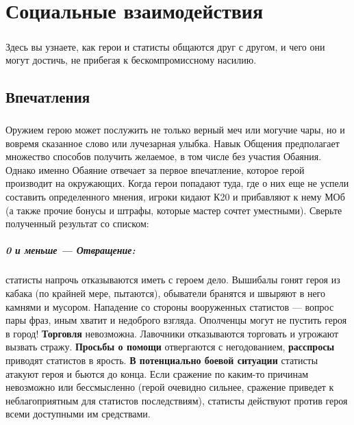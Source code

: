 \chapter{Социальные взаимодействия}
\paragraph{}
Здесь вы узнаете, как герои и статисты общаются друг с другом, и чего они могут достичь, не прибегая к бескомпромиссному насилию.
\section{Впечатления}
\paragraph{}
Оружием герою может послужить не только верный меч или могучие чары, но и вовремя сказанное слово или лучезарная улыбка. Навык Общения предполагает множество способов получить желаемое, в том числе без участия Обаяния. Однако именно Обаяние отвечает за первое впечатление, которое герой производит на окружающих. Когда герои попадают туда, где о них еще не успели составить определенного мнения, игроки кидают К20 и прибавляют к нему МОб (а также прочие бонусы и штрафы, которые мастер сочтет уместными). Сверьте полученный результат со списком:
\paragraph{0 и меньше — Отвращение:} статисты напрочь отказываются иметь с героем дело. Вышибалы гонят героя из кабака (по крайней мере, пытаются), обыватели бранятся и швыряют в него камнями и мусором. Нападение со стороны вооруженных статистов — вопрос пары фраз, иным хватит и недоброго взгляда. Ополченцы могут не пустить героя в город!
\newline
\textbf{Торговля} невозможна. Лавочники отказываются торговать и угрожают вызвать стражу.
\newline
\textbf{Просьбы о помощи} отвергаются с негодованием, \textbf{расспросы} приводят статистов в ярость.
\newline
\textbf{В потенциально боевой ситуации} статисты атакуют героя и бьются до конца. Если сражение по каким-то причинам невозможно или бессмысленно (герой очевидно сильнее, сражение приведет к неблагоприятным для статистов последствиям), статисты действуют против героя всеми доступными им средствами.
